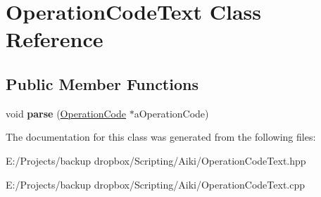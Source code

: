 \hypertarget{a00016}{\section{Operation\+Code\+Text Class Reference}
\label{a00016}
}
\subsection*{Public Member Functions}
\begin{DoxyCompactItemize}
\item 
\hypertarget{a00016_ac7a997e924fdd8217194b4770cec8190}{void {\bfseries parse} (\hyperlink{a00015}{Operation\+Code} $\ast$a\+Operation\+Code)}\label{a00016_ac7a997e924fdd8217194b4770cec8190}

\end{DoxyCompactItemize}


The documentation for this class was generated from the following files\+:\begin{DoxyCompactItemize}
\item 
E\+:/\+Projects/backup dropbox/\+Scripting/\+Aiki/Operation\+Code\+Text.\+hpp\item 
E\+:/\+Projects/backup dropbox/\+Scripting/\+Aiki/Operation\+Code\+Text.\+cpp\end{DoxyCompactItemize}
